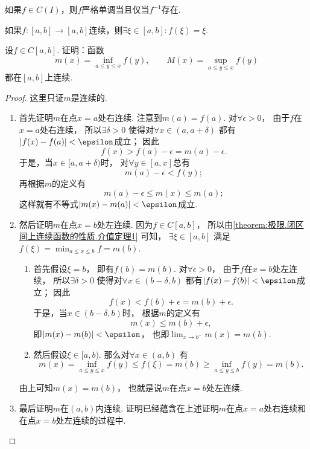 \begin{corollary}
如果\(f \in C(I)\)，则\(f\)严格单调当且仅当\(f^{-1}\)存在.
\end{corollary}

\begin{corollary}
如果\(f\colon[a,b]\to[a,b]\)连续，则\(\exists\xi\in[a,b]: f(\xi)=\xi\).
\end{corollary}

\begin{example}
设\(f \in C[a,b]\).
证明：函数\[
	m(x) = \inf_{a \leq y \leq x} f(y), \qquad
	M(x) = \sup_{a \leq y \leq x} f(y)
\]都在\([a,b]\)上连续.
\begin{proof}
这里只证\(m\)是连续的.
\begin{enumerate}
	\item 首先证明\(m\)在点\(x=a\)处右连续.
	注意到\(m(a) = f(a)\).
	对\(\forall\epsilon>0\)，
	由于\(f\)在\(x=a\)处右连续，
	所以\(\exists\delta>0\)
	使得对\(\forall x\in(a,a+\delta)\)
	都有\(\abs{f(x)-f(a)}<\epsilon\)成立；
	因此\[
	f(x)
	> f(a) - \epsilon
	= m(a) - \epsilon.
	\]
	于是，当\(x\in[a,a+\delta)\)时，
	对\(\forall y\in[a,x]\)总有\[
		m(a) - \epsilon < f(y);
	\]
	再根据\(m\)的定义有\[
		m(a) - \epsilon \leq m(x) \leq m(a);
	\]
	这样就有不等式\(\abs{m(x)-m(a)}<\epsilon\)成立.

	\item 然后证明\(m\)在点\(x=b\)处左连续.
	因为\(f \in C[a,b]\)，
	所以由\cref{theorem:极限.闭区间上连续函数的性质.介值定理1} 可知，
	\(\exists\xi\in[a,b]\)
	满足\(f(\xi) = \min_{a \leq x \leq b} f = m(b)\).
		\begin{enumerate}
			\item 首先假设\(\xi=b\)，
			即有\(f(b)=m(b)\).
			对\(\forall\epsilon>0\)，
			由于\(f\)在\(x=b\)处左连续，
			所以\(\exists\delta>0\)
			使得对\(\forall x\in(b-\delta,b)\)
			都有\(\abs{f(x)-f(b)}<\epsilon\)成立；
			因此\[
				f(x)
				< f(b) + \epsilon
				= m(b) + \epsilon.
			\]
			于是，当\(x\in(b-\delta,b)\)时，
			根据\(m\)的定义有\[
				m(x) \leq m(b) + \epsilon,
			\]
			即\(\abs{m(x)-m(b)}<\epsilon\)，
			也即\(\lim_{x \to b^-} m(x) = m(b)\).

			\item 然后假设\(\xi\in[a,b)\).
			那么对\(\forall x\in(a,b)\)
			有\[
				m(x) = \inf_{a \leq y \leq x} f(y)
				\leq f(\xi)
				= m(b)
				\geq \inf_{a \leq y \leq b} f(y)
				= m(b).
			\]
		\end{enumerate}
		由上可知\(m(x) = m(b)\)，
		也就是说\(m\)在点\(x=b\)处左连续.

	\item 最后证明\(m\)在\((a,b)\)内连续.
	证明已经蕴含在上述证明\(m\)在点\(x=a\)处右连续和在点\(x=b\)处左连续的过程中.
	\qedhere
\end{enumerate}
\end{proof}
\end{example}

